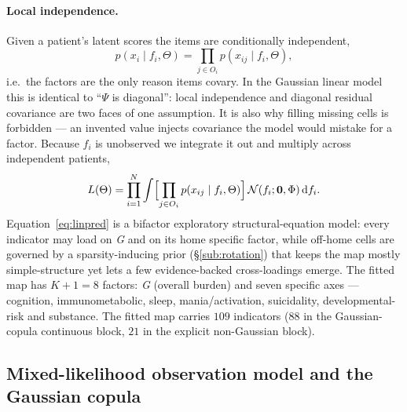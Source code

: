 \documentclass[11pt]{article}
\newcommand{\Gfac}{\textit{G}}
\theoremstyle{plain}
\theoremstyle{definition}
\begin{document}
\paragraph{Local independence.} Given a patient's latent scores the items are
conditionally independent,
\begin{equation}
  p(x_i\mid f_i,\Theta)=\prod_{j\in O_i} p(x_{ij}\mid f_i,\Theta),
  \label{eq:localindep}
\end{equation}
i.e.\ the factors are the only reason items covary. In the Gaussian linear model this is
identical to ``$\Psi$ is diagonal'': local independence and diagonal residual covariance
are two faces of one assumption. It is also why filling missing cells is forbidden --- an
invented value injects covariance the model would mistake for a factor. Because $f_i$ is
unobserved we integrate it out and multiply across independent patients,
\begin{equation}
  L(\Theta)=\prod_{i=1}^{N}\int\Bigl[\prod_{j\in O_i} p(x_{ij}\mid f_i,\Theta)\Bigr]\,
  \mathcal{N}(f_i;\mathbf 0,\Phi)\,\mathrm{d}f_i .
  \label{eq:fulllik}
\end{equation}
Equation~\eqref{eq:linpred} is a bifactor exploratory structural-equation model: every
indicator may load on \Gfac{} and on its home specific factor, while off-home cells are
governed by a sparsity-inducing prior (\S\ref{sub:rotation}) that keeps the map mostly
simple-structure yet lets a few evidence-backed cross-loadings emerge. The fitted map has
$K{+}1=8$ factors: \Gfac{} (overall burden) and seven specific axes --- cognition,
immunometabolic, sleep, mania/activation, suicidality, developmental-risk and substance.
The fitted map carries $109$ indicators
($88$ in the Gaussian-copula continuous block, $21$ in the explicit non-Gaussian block).

\subsection{Mixed-likelihood observation model and the Gaussian copula}
\label{sub:mixed}
\end{document}
